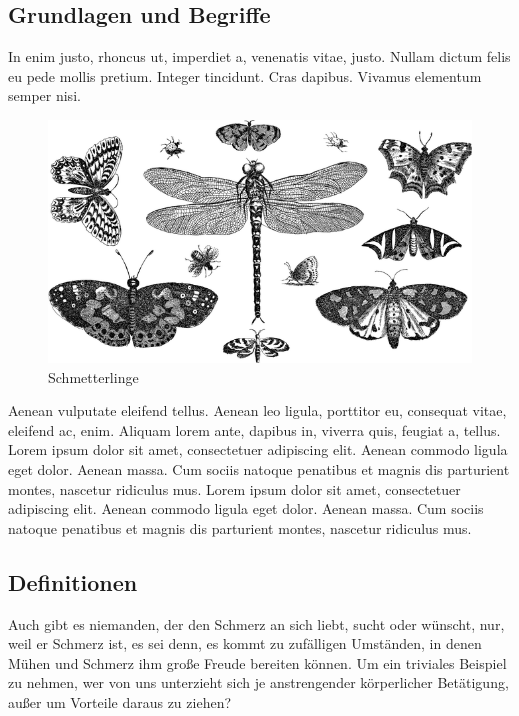\documentclass[paper=a4,fontsize=12pt,ngerman]{scrartcl}
\begin{document}
\subsection{Grundlagen und Begriffe}
In enim justo, rhoncus ut, imperdiet a, venenatis vitae, justo. Nullam dictum 
felis eu pede mollis pretium. Integer tincidunt. Cras dapibus. Vivamus 
elementum semper nisi.
\begin{figure}[h]
\begin{center}
  \includegraphics[scale=0.35]{graphics/insects-5304085_640.png}
  \caption{Schmetterlinge}
  \label{schmetter}
\end{center}
\end{figure}
Aenean vulputate eleifend tellus. Aenean leo ligula, porttitor eu, consequat 
vitae, eleifend ac, enim. Aliquam lorem ante, dapibus in, viverra quis, 
feugiat a, tellus. Lorem ipsum dolor sit amet, consectetuer adipiscing elit. 
Aenean commodo ligula eget dolor. Aenean massa. Cum sociis natoque penatibus 
et magnis dis parturient montes, nascetur ridiculus mus. Lorem ipsum dolor 
sit amet, consectetuer adipiscing elit. Aenean commodo ligula eget dolor. 
Aenean massa. Cum sociis natoque penatibus et magnis dis parturient montes, 
nascetur ridiculus mus.

\subsection{Definitionen}
Auch gibt es niemanden, der den Schmerz an sich liebt, sucht oder wünscht, 
nur, weil er Schmerz ist, es sei denn, es kommt zu zufälligen Umständen, in 
denen Mühen und Schmerz ihm große Freude bereiten können. Um ein triviales 
Beispiel zu nehmen, wer von uns unterzieht sich je anstrengender körperlicher 
Betätigung, außer um Vorteile daraus zu ziehen?
\end{document}
